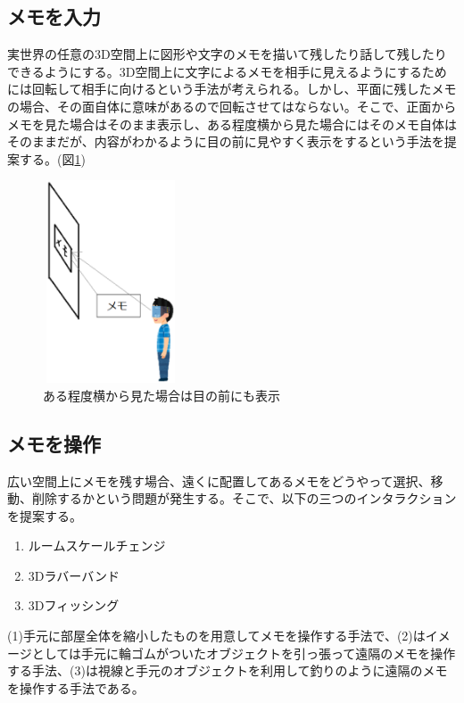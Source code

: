 \documentclass[technicalreport]{ieicej}
\begin{document}
\subsection{メモを入力}
実世界の任意の3D空間上に図形や文字のメモを描いて残したり話して残したりできるようにする。3D空間上に文字によるメモを相手に見えるようにするためには回転して相手に向けるという手法が考えられる。しかし、平面に残したメモの場合、その面自体に意味があるので回転させてはならない。そこで、正面からメモを見た場合はそのまま表示し、ある程度横から見た場合にはそのメモ自体はそのままだが、内容がわかるように目の前に見やすく表示をするという手法を提案する。(図\ref{fig:memo_wall})

\begin{figure}[h]
  \begin{center}
    \includegraphics[clip,height=6.0cm,width=4.0cm]{./memo_wall.eps}
    \caption{ある程度横から見た場合は目の前にも表示}
    \label{fig:memo_wall}
  \end{center}
\end{figure}

\subsection{メモを操作}
広い空間上にメモを残す場合、遠くに配置してあるメモをどうやって選択、移動、削除するかという問題が発生する。そこで、以下の三つのインタラクションを提案する。

\begin{enumerate}[(1)]
 \item ルームスケールチェンジ
 \item 3Dラバーバンド
 \item 3Dフィッシング
\end{enumerate}

(1)手元に部屋全体を縮小したものを用意してメモを操作する手法で、(2)はイメージとしては手元に輪ゴムがついたオブジェクトを引っ張って遠隔のメモを操作する手法、(3)は視線と手元のオブジェクトを利用して釣りのように遠隔のメモを操作する手法である。
\end{document}
